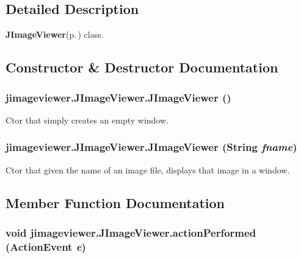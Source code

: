 \subsection{Detailed Description}
{\bf JImage\-Viewer}{\rm (p.\,\pageref{classjimageviewer_1_1_j_image_viewer})} class. 



\subsection{Constructor \& Destructor Documentation}
\subsubsection{\setlength{\rightskip}{0pt plus 5cm}jimageviewer.JImage\-Viewer.JImage\-Viewer ()}\label{classjimageviewer_1_1_j_image_viewer_dd172c41d3dd80c763605c33efebe477}


Ctor that simply creates an empty window. 

\subsubsection{\setlength{\rightskip}{0pt plus 5cm}jimageviewer.JImage\-Viewer.JImage\-Viewer (String {\em fname})}\label{classjimageviewer_1_1_j_image_viewer_2ba6f7c19c708614a59b891671c91205}


Ctor that given the name of an image file, displays that image in a window. 



\subsection{Member Function Documentation}
\subsubsection{\setlength{\rightskip}{0pt plus 5cm}void jimageviewer.JImage\-Viewer.action\-Performed (Action\-Event {\em e})}\label{classjimageviewer_1_1_j_image_viewer_bb42305de071680672095253dc72d4ef}


